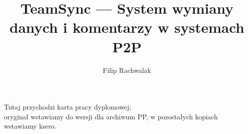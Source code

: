 \documentclass[polish,a4paper,twoside]{ppfcmthesis}
\author{Filip Rachwalak}                              %
\title{TeamSync --- System wymiany danych i komentarzy w systemach P2P}                   %
\begin{document}
\frontmatter\pagestyle{empty}%
\maketitle\cleardoublepage%

\thispagestyle{empty}\vspace*{\fill}%
\begin{center}Tutaj przychodzi karta pracy dyplomowej;\\oryginał wstawiamy do wersji dla archiwum PP, w pozostałych kopiach wstawiamy ksero.\end{center}%
\vfill\cleardoublepage%

\pagestyle{ppfcmthesis}%
\tableofcontents* \cleardoublepage%

\mainmatter%








\cleardoublepage\appendix%

% 

{\raggedright\sloppy\small}

\ppcolophon
\end{document}
